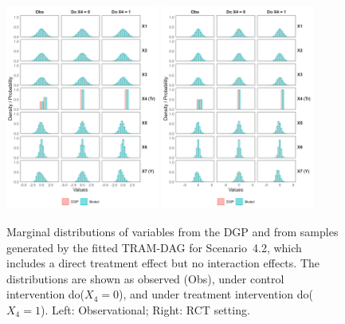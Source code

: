 \begin{figure}[htbp]
\centering
\includegraphics[width=0.45\textwidth]{img/results/observ_scenario2_sampling_distributions_vertical.png}
\includegraphics[width=0.45\textwidth]{img/results/rct_scenario2_sampling_distributions_vertical.png}
\caption{Marginal distributions of variables from the DGP and from samples generated by the fitted TRAM-DAG for Scenario~4.2, which includes a direct treatment effect but no interaction effects. The distributions are shown as observed (Obs), under control intervention do($X_4 = 0$), and under treatment intervention do($X_4 = 1$). Left: Observational; Right: RCT setting.}
\label{fig:scenario2_sampling_distributions_vertical}
\end{figure}



